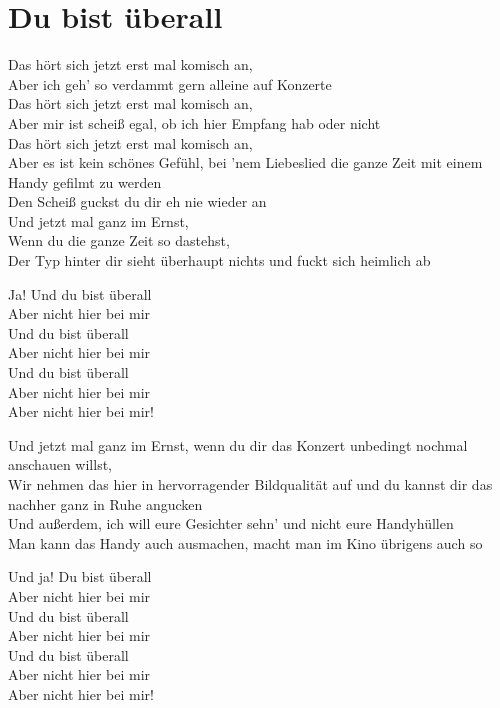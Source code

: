\documentclass[]{book}
\begin{document}
\hypertarget{du-bist-uberall}{%
\section{Du bist überall}\label{du-bist-uberall}}

Das hört sich jetzt erst mal komisch an,\\
Aber ich geh' so verdammt gern alleine auf Konzerte\\
Das hört sich jetzt erst mal komisch an,\\
Aber mir ist scheiß egal, ob ich hier Empfang hab oder nicht\\
Das hört sich jetzt erst mal komisch an,\\
Aber es ist kein schönes Gefühl, bei 'nem Liebeslied die ganze Zeit mit einem Handy gefilmt zu werden\\
Den Scheiß guckst du dir eh nie wieder an\\
Und jetzt mal ganz im Ernst,\\
Wenn du die ganze Zeit so dastehst,\\
Der Typ hinter dir sieht überhaupt nichts und fuckt sich heimlich ab

Ja! Und du bist überall\\
Aber nicht hier bei mir\\
Und du bist überall\\
Aber nicht hier bei mir\\
Und du bist überall\\
Aber nicht hier bei mir\\
Aber nicht hier bei mir!

Und jetzt mal ganz im Ernst, wenn du dir das Konzert unbedingt nochmal anschauen willst,\\
Wir nehmen das hier in hervorragender Bildqualität auf und du kannst dir das nachher ganz in Ruhe angucken\\
Und außerdem, ich will eure Gesichter sehn' und nicht eure Handyhüllen\\
Man kann das Handy auch ausmachen, macht man im Kino übrigens auch so

Und ja! Du bist überall\\
Aber nicht hier bei mir\\
Und du bist überall\\
Aber nicht hier bei mir\\
Und du bist überall\\
Aber nicht hier bei mir\\
Aber nicht hier bei mir!
\end{document}

